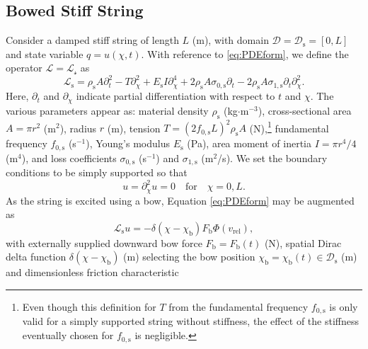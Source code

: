 \documentclass[dvipsnames, pdftex]{article}
\def\SWcomment[#1]{\textcolor{Bittersweet}{#1}}
\def\MDcomment[#1]{\textcolor{Blue}{#1}}
\def\stringx{\chi}
\def\ugen{q}
\def\us{u}
\begin{document}
\subsection{Bowed Stiff String}
Consider a damped stiff string of length $L$ (m), with domain $\mathcal{D} = \mathcal{D}_\text{s} = [0,L]$ and state variable $\ugen = \us(\stringx,t)$.  
With reference to \eqref{eq:PDEform}, we define the operator $\mathcal{L} = \mathcal{L_\text{s}}$ as \cite{bilbao2009numerical}
\begin{equation}
    \mathcal{L}_\text{s} = \rho_\text{s} A \partial_t^2 - T\partial_\stringx^2 + E_\text{s}I\partial_\stringx^4+2\rho_\text{s} A\sigma_{0,\text{s}}\partial_t-2\rho_\text{s} A\sigma_{1,\text{s}}\partial_t\partial_\stringx^2.
\end{equation}
Here, $\partial_{t}$ and $\partial_{\stringx}$ indicate partial differentiation with respect to $t$ and $\stringx$. The various parameters appear as: material density $\rho_\text{s}$ (kg$\cdot$m$^{-3}$), cross-sectional area $A = \pi r^2$ (m$^2$), radius $r$ (m), tension $T = (2f_{0,\text{s}}L)^2\rho_\text{s}A$ (N),\footnote{Even though this definition for $T$ from the fundamental frequency $f_{0,\text{s}}$ is only valid for a simply supported string without stiffness, the effect of the stiffness eventually chosen for $f_{0,\text{s}}$ is negligible.} %
fundamental frequency $f_{0,\text{s}}$ (s$^{-1}$), Young's modulus $E_\text{s}$ (Pa), area moment of inertia $I=\pi r^4 / 4$ (m$^4$), and loss coefficients $\sigma_{0,\text{s}}$ (s$^{-1}$) and $\sigma_{1,\text{s}}$ (m$^2$/s). We set the boundary conditions to be simply supported so that
\begin{equation}\label{eq:boundary}
    \us = \partial_\stringx^2\us = 0 \quad \text{for} \quad \stringx = 0, L.
\end{equation}
As the string is excited using a bow, Equation \eqref{eq:PDEform} may be augmented as \cite{bilbao2009numerical}
\begin{equation}\label{eq:bowedString}
    \mathcal{L}_\text{s}\us = -\delta(\stringx-\stringx_\text{b})F_\text{b}\Phi(v_\text{rel}),
\end{equation}
with externally supplied downward bow force $F_\text{b} = F_\text{b}(t)$ (N), spatial Dirac delta function $\delta(\stringx-\stringx_\text{b})$ (m) selecting the bow position $\stringx_\text{b} = \stringx_\text{b}(t)\in \mathcal{D}_\text{s}$ (m) and dimensionless friction characteristic
\end{document}
